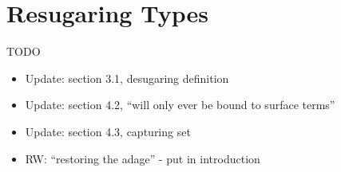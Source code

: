 \chapter{Resugaring Types}\label{chap:resugar-types}

TODO
\begin{itemize}
\item Update: section 3.1, desugaring definition
\item Update: section 4.2, ``will only ever be bound to surface terms''
\item Update: section 4.3, capturing set
\item RW: ``restoring the adage'' - put in introduction
\end{itemize}
